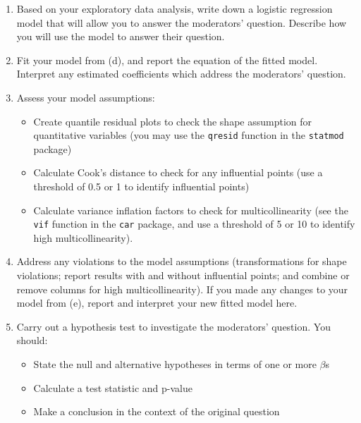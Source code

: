 \documentclass[11pt]{article}
\begin{document}
\begin{enumerate}
\begin{enumerate}
\begin{itemize}
\end{itemize}
\item Based on your exploratory data analysis, write down a logistic regression model that will allow you to answer the moderators' question. Describe how you will use the model to answer their question.
\item Fit your model from (d), and report the equation of the fitted model. Interpret any estimated coefficients which address the moderators' question.
\item Assess your model assumptions:
\begin{itemize}
\item Create quantile residual plots to check the shape assumption for quantitative variables (you may use the \texttt{qresid} function in the \texttt{statmod} package)
\item Calculate Cook's distance to check for any influential points (use a threshold of 0.5 or 1 to identify influential points)
\item Calculate variance inflation factors to check for multicollinearity (see the \texttt{vif} function in the \texttt{car} package, and use a threshold of 5 or 10 to identify high multicollinearity). 
\end{itemize}
\item Address any violations to the model assumptions (transformations for shape violations; report results with and without influential points; and combine or remove columns for high multicollinearity). If you made any changes to your model from (e), report and interpret your new fitted model here.
\item Carry out a hypothesis test to investigate the moderators' question. You should:
\begin{itemize}
\item State the null and alternative hypotheses in terms of one or more $\beta$s
\item Calculate a test statistic and p-value
\item Make a conclusion in the context of the original question
\end{itemize}
\end{enumerate} 
\end{enumerate}
\end{document}
